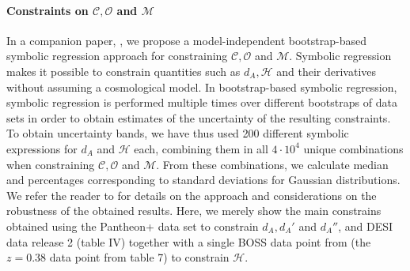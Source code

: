 \documentclass[reprint,aps,prd,nofootinbib,a4paper,10pt,twocolumn,superscriptaddress]{revtex4-2}
\begin{document}
\paragraph*{Constraints on $\mathcal{C}, \mathcal{O}$ and $\mathcal{M}$}
In a companion paper, \cite{PRD}, we propose a model-independent bootstrap-based symbolic regression approach for constraining $\mathcal{C}, \mathcal{O}$ and $\mathcal{M}$. Symbolic regression makes it possible to constrain quantities such as $d_A, \mathcal{H}$ and their derivatives without assuming a cosmological model. In bootstrap-based symbolic regression, symbolic regression is performed multiple times over different bootstraps of data sets in order to obtain estimates of the uncertainty of the resulting constraints. To obtain uncertainty bands, we have thus used 200 different symbolic expressions for $d_A$ and $\mathcal{H}$ each, combining them in all $4\cdot 10^4$ unique combinations when constraining $\mathcal{C}, \mathcal{O}$ and $\mathcal{M}$. From these combinations, we calculate median and percentages corresponding to standard deviations for Gaussian distributions. We refer the reader to \cite{PRD} for details on the approach and considerations on the robustness of the obtained results. Here, we merely show the main constrains obtained using the Pantheon+ \cite{pantheon} data set to constrain $d_A, d_A'$ and $d_A''$, and DESI data release 2 \cite{DR2} (table IV) together with a single BOSS data point from \cite{BOSS72} (the $z = 0.38$ data point from table 7) to constrain $\mathcal{H}$.
\end{document}
